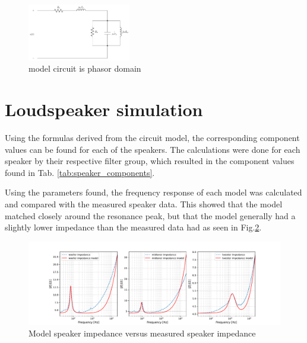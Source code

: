 \begin{figure}[H]
    \centering
    \includegraphics[width=0.4\textwidth]{TU Delft Booming Bass Project Report/figures/FilterGroup/impedance_model_phasor.pdf}
    \captionsetup{justification=raggedright, labelfont=bf}
    \caption{model circuit is phasor domain}
    \label{fig:/model_phasor}
\end{figure}


\section{Loudspeaker simulation}
Using the formulas derived from the circuit model, the corresponding component values can be found for each of the speakers. The calculations were done for each speaker by their respective filter group, which resulted in the component values found in Tab. \ref{tab:speaker_components}. 

Using the parameters found, the frequency response of each model was calculated and compared with the measured speaker data. This showed that the model matched closely around the resonance peak, but that the model generally had a slightly lower impedance than the measured data had as seen in Fig.\ref{fig:/model vs measured impedance}. 

\begin{figure}[H]
    \centering
    \includegraphics[width=1\textwidth]{TU Delft Booming Bass Project Report/figures/FilterGroup/model vs measured impedance.pdf}
    \captionsetup{justification=raggedright, labelfont=bf}
    \caption{Model speaker impedance versus measured speaker impedance}
    \label{fig:/model vs measured impedance}
\end{figure}

